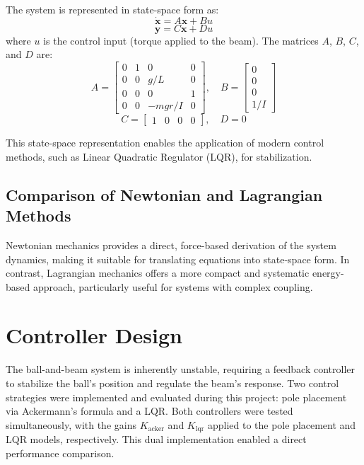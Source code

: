 \documentclass[conference]{IEEEtran}
\begin{document}
The system is represented in state-space form as:
\begin{equation}
\dot{\mathbf{x}} = A \mathbf{x} + B u
\end{equation}
\begin{equation}
\mathbf{y} = C \mathbf{x} + D u
\end{equation}
where \(u\) is the control input (torque applied to the beam). The matrices \(A\), \(B\), \(C\), and \(D\) are:
\[
A = \begin{bmatrix}
0 & 1 & 0 & 0 \\
0 & 0 & g/L & 0 \\
0 & 0 & 0 & 1 \\
0 & 0 & -m g r/I & 0
\end{bmatrix}, \quad
B = \begin{bmatrix}
0 \\ 0 \\ 0 \\ 1/I
\end{bmatrix}
\]
\[
C = \begin{bmatrix}
1 & 0 & 0 & 0
\end{bmatrix}, \quad
D = 0
\]

This state-space representation enables the application of modern control methods, such as Linear Quadratic Regulator (LQR), for stabilization.

\subsection{Comparison of Newtonian and Lagrangian Methods}
\label{subsec:model_comparison}
Newtonian mechanics provides a direct, force-based derivation of the system dynamics, making it suitable for translating equations into state-space form. In contrast, Lagrangian mechanics offers a more compact and systematic energy-based approach, particularly useful for systems with complex coupling.

\section{Controller Design}
\label{sec:control_design}
The ball-and-beam system is inherently unstable, requiring a feedback controller to stabilize the ball's position and regulate the beam's response. Two control strategies were implemented and evaluated during this project: pole placement via Ackermann's formula and a LQR. Both controllers were tested simultaneously, with the gains \(K_{\text{acker}}\) and \(K_{\text{lqr}}\) applied to the pole placement and LQR models, respectively. This dual implementation enabled a direct performance comparison.
\end{document}
